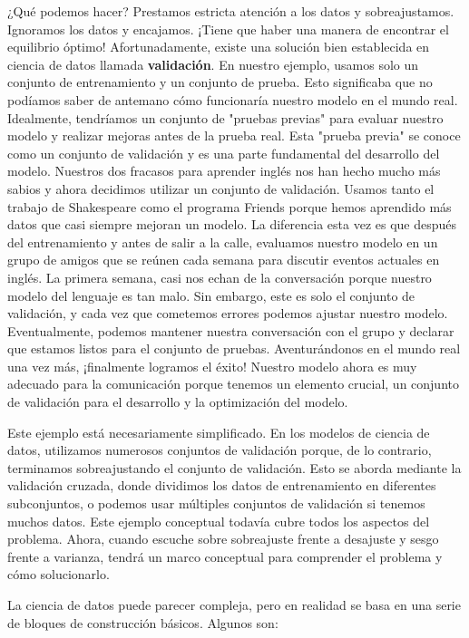 ¿Qué podemos hacer? Prestamos estricta atención a los datos y sobreajustamos. Ignoramos los datos y encajamos. ¡Tiene que haber una manera de encontrar el equilibrio óptimo! Afortunadamente, existe una solución bien establecida en ciencia de datos llamada \textbf{validación}. En nuestro ejemplo, usamos solo un conjunto de entrenamiento y un conjunto de prueba. Esto significaba que no podíamos saber de antemano cómo funcionaría nuestro modelo en el mundo real. Idealmente, tendríamos un conjunto de "pruebas previas" para evaluar nuestro modelo y realizar mejoras antes de la prueba real. Esta "prueba previa" se conoce como un conjunto de validación y es una parte fundamental del desarrollo del modelo.
Nuestros dos fracasos para aprender inglés nos han hecho mucho más sabios y ahora decidimos utilizar un conjunto de validación. Usamos tanto el trabajo de Shakespeare como el programa Friends porque hemos aprendido más datos que casi siempre mejoran un modelo. La diferencia esta vez es que después del entrenamiento y antes de salir a la calle, evaluamos nuestro modelo en un grupo de amigos que se reúnen cada semana para discutir eventos actuales en inglés. La primera semana, casi nos echan de la conversación porque nuestro modelo del lenguaje es tan malo. Sin embargo, este es solo el conjunto de validación, y cada vez que cometemos errores podemos ajustar nuestro modelo. Eventualmente, podemos mantener nuestra conversación con el grupo y declarar que estamos listos para el conjunto de pruebas. Aventurándonos en el mundo real una vez más, ¡finalmente logramos el éxito! Nuestro modelo ahora es muy adecuado para la comunicación porque tenemos un elemento crucial, un conjunto de validación para el desarrollo y la optimización del modelo.

Este ejemplo está necesariamente simplificado. En los modelos de ciencia de datos, utilizamos numerosos conjuntos de validación porque, de lo contrario, terminamos sobreajustando el conjunto de validación. Esto se aborda mediante la validación cruzada, donde dividimos los datos de entrenamiento en diferentes subconjuntos, o podemos usar múltiples conjuntos de validación si tenemos muchos datos. Este ejemplo conceptual todavía cubre todos los aspectos del problema. Ahora, cuando escuche sobre sobreajuste frente a desajuste y sesgo frente a varianza, tendrá un marco conceptual para comprender el problema y cómo solucionarlo.

La ciencia de datos puede parecer compleja, pero en realidad se basa en una serie de bloques de construcción básicos. Algunos son:

